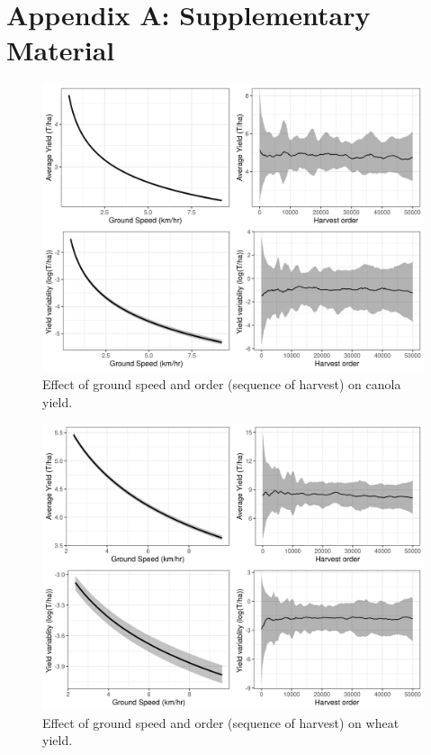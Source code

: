 \documentclass[]{elsarticle} %
\begin{document}
\newpage

\hypertarget{appendix-a-supplementary-material}{%
\section*{Appendix A: Supplementary Material}\label{appendix-a-supplementary-material}}

\begin{figure}
\includegraphics[width=1\linewidth]{../Figures/groundSpeed_canola} \caption{Effect of ground speed and order (sequence of harvest) on canola yield.}\label{fig:canolaPlotSpeed}
\end{figure}

\begin{figure}
\includegraphics[width=1\linewidth]{../Figures/groundSpeed_wheat} \caption{Effect of ground speed and order (sequence of harvest) on wheat yield.}\label{fig:wheatPlotSpeed}
\end{figure}
\end{document}
